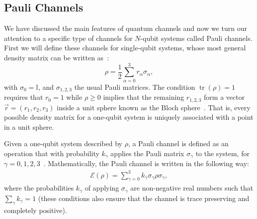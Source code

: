 \documentclass[10pt,letterpaper]{article} %
\DeclareMathOperator{\tr}{tr}
\begin{document}
\subsection{Pauli Channels}  \label{subsec: Pauli Channels} %

We have discussed the main features of quantum channels and 
now we turn our attention to a specific 
type of channels for $N$-qubit systems called Pauli channels.
First we will define these channels for single-qubit systems,
whose most general density matrix can be written as~\cite{chuangbook}:
\begin{equation}
\label{eq: Density Matrix}
\rho = \dfrac{1}{2} \sum_{\alpha=0}^{3} r_{\alpha} \sigma_{\alpha},
\end{equation}
with $\sigma_0 = \mathbb{I}$, and $\sigma_{1,2,3}$ the usual Pauli matrices.
The condition $\tr(\rho) = 1$ requires that $r_0 = 1$ while $\rho \geq 0$ 
implies that the remaining $r_{1,2,3}$ form
a vector $\vec{r}= (r_1,r_2,r_3)$ inside a unit sphere known as the Bloch sphere~\cite{Marinescu}.
That is, every possible density matrix for a one-qubit
system is uniquely associated with a point in a unit sphere. 

Given a one-qubit system described by $\rho$, 
a Pauli channel is defined as an operation that with probability $k_{\gamma}$
applies the Pauli matrix $\sigma_{\gamma}$ to
the system, for $\gamma = 0,1,2,3$~\cite{geometry}.
Mathematically, the Pauli channel is written in the following way:
\begin{eqnarray}
\label{eq: Pauli channel 1 qbit}
\mathcal{E}(\rho) = \sum_{\gamma=0}^3 k_{\gamma} \sigma_{\gamma} \rho \sigma_{\gamma},
\end{eqnarray} 
where the probabilities $k_{\gamma}$ of applying $\sigma_{\gamma}$
are non-negative real numbers such that 
$\sum_{\gamma} k_{\gamma} = 1$ (these conditions also ensure that the channel is 
trace preserving and completely positive).
\end{document}
